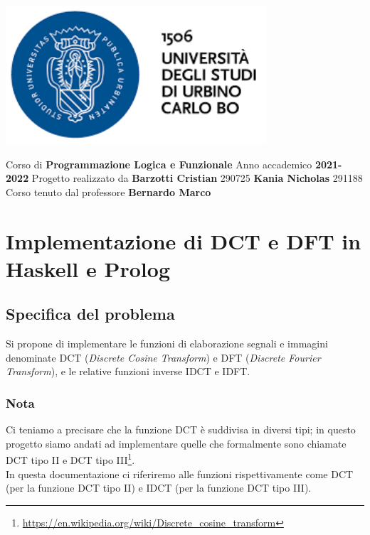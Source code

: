 \documentclass{report}
\begin{document}
	\centerline{\includegraphics{logo1}}
	\bigbreak

	\begin{center}
		Corso di
        \vskip 0.2cm
		\large{\textbf{Programmazione Logica e Funzionale}}
		\vskip 2cm
		Anno accademico
        \vskip 0.2cm
 		\textbf{2021-2022}
		\vskip 2cm
		Progetto realizzato da
        \vskip 0.2cm
		\textbf{Barzotti Cristian}
        \vskip 0.1cm 290725
        \vskip 0.2cm
        \textbf{Kania Nicholas} 
        \vskip 0.1cm 
        291188
		\vfill
		Corso tenuto dal professore
        \vskip 0.2cm
		\large{\textbf{Bernardo Marco}}
	\end{center}
	
	\part*{Implementazione di DCT e DFT in Haskell e Prolog}
	\tableofcontents %

	
	\chapter{Specifica del problema}
	Si propone di implementare le funzioni di elaborazione segnali e immagini denominate DCT (\textit{Discrete Cosine Transform}) e DFT (\textit{Discrete Fourier Transform}), e le relative funzioni inverse IDCT e IDFT. \\
	\section*{Nota}
	Ci teniamo a precisare che la funzione DCT è suddivisa in diversi tipi; in questo progetto siamo andati ad implementare quelle che formalmente sono chiamate DCT tipo II e DCT tipo III\footnote{\url{https://en.wikipedia.org/wiki/Discrete_cosine_transform}}.\\ 
	In questa documentazione ci riferiremo alle funzioni rispettivamente come DCT (per la funzione DCT tipo II) e IDCT (per la funzione DCT tipo III).
	
\end{document}
